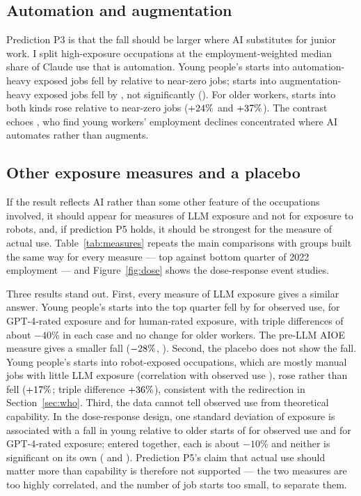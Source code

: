 \documentclass[11pt]{article}
\begin{document}
\subsection{Automation and augmentation}

Prediction P3 is that the fall should be larger where AI substitutes for junior work. I split high-exposure occupations at the employment-weighted median share of Claude use that is automation. Young people's starts into automation-heavy exposed jobs fell by \autoYoungAbs{} relative to near-zero jobs; starts into augmentation-heavy exposed jobs fell by \augYoungAbs, not significantly (\augYoungP). For older workers, starts into both kinds rose relative to near-zero jobs ($+24\%$ and $+37\%$). The contrast echoes \citet{brynjolfsson2025canaries}, who find young workers' employment declines concentrated where AI automates rather than augments.

\subsection{Other exposure measures and a placebo}

If the result reflects AI rather than some other feature of the occupations involved, it should appear for measures of LLM exposure and not for exposure to robots, and, if prediction P5 holds, it should be strongest for the measure of actual use. Table~\ref{tab:measures} repeats the main comparisons with groups built the same way for every measure --- top against bottom quarter of 2022 employment --- and Figure~\ref{fig:dose} shows the dose-response event studies.

Three results stand out. First, every measure of LLM exposure gives a similar answer. Young people's starts into the top quarter fell by \mqObsYoungAbs{} for observed use, \mqGPTYoungAbs{} for GPT-4-rated exposure and \mqGPThYoungAbs{} for human-rated exposure, with triple differences of about $-40$\% in each case and no change for older workers. The pre-LLM AIOE measure gives a smaller fall ($-28\%$, \mqAIOEYoungP). Second, the placebo does not show the fall. Young people's starts into robot-exposed occupations, which are mostly manual jobs with little LLM exposure (correlation with observed use \corRobot), rose rather than fell ($+17\%$; triple difference $+36\%$), consistent with the redirection in Section~\ref{sec:who}. Third, the data cannot tell observed use from theoretical capability. In the dose-response design, one standard deviation of exposure is associated with a fall in young relative to older starts of \drObsAbs{} for observed use and \drGPTAbs{} for GPT-4-rated exposure; entered together, each is about $-10$\% and neither is significant on its own (\hrObsP{} and \hrGPTP). Prediction P5's claim that actual use should matter more than capability is therefore not supported --- the two measures are too highly correlated, and the number of job starts too small, to separate them.
\end{document}
